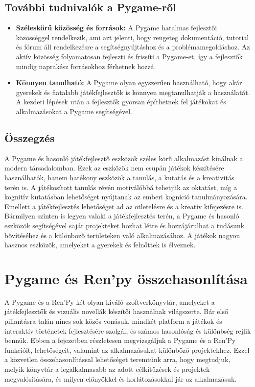 \subsection{További tudnivalók a Pygame-ről}

\begin{itemize}
\item \textbf{Széleskörű közösség és források:}
A Pygame hatalmas fejlesztői közösséggel rendelkezik, ami azt jelenti, hogy rengeteg dokumentáció, tutorial és fórum áll rendelkezésre a segítségnyújtáshoz és a problémamegoldáshoz. Az aktív közösség folyamatosan fejleszti és frissíti a Pygame-et, így a fejlesztők mindig naprakész forrásokhoz férhetnek hozzá.

\item \textbf{Könnyen tanulható:}
A Pygame olyan egyszerűen használható, hogy akár gyerekek és fiatalabb játékfejlesztők is könnyen megtanulhatják a használatát. A kezdeti lépések után a fejlesztők gyorsan építhetnek fel játékokat és alkalmazásokat a Pygame segítségével.
\end{itemize}

\subsection{Összegzés}
 A Pygame és hasonló játékfejlesztő eszközök széles körű alkalmazást kínálnak a modern társadalomban.
 Ezek az eszközök nem csupán játékok készítésére használhatók, hanem hatékony eszközök a tanulás,
  a kutatás és a kreativitás terén is. A játékosított tanulás révén motiválóbbá tehetjük az oktatást, 
  míg a kognitív kutatásban lehetőséget nyújtanak az emberi kogníció tanulmányozására.
   Emellett a játékfejlesztés lehetőséget ad az ötletelésre és a kreatív kifejezésre is.
    Bármilyen szinten is legyen valaki a játékfejlesztés terén,
 a Pygame és hasonló eszközök segítségével saját projekteket hozhat létre és hozzájárulhat a
  tudásunk bővítéséhez és a különböző területeken való alkalmazásához.
   A játékok nagyon hasznos eszközök, amelyeket a gyerekek és felnőttek is élveznek.



\section{Pygame és Ren'py összehasonlítása} 
 A Pygame és a Ren'Py \cite{renpy} két olyan kiváló szoftverkönyvtár, amelyeket a játékfejlesztők és vizuális novellák készítői használnak világszerte. Bár első pillantásra talán nincs sok közös vonásuk, mindkét platform a játékok és interaktív történetek fejlesztésére szolgál, és számos hasonlóság és különbség rejlik bennük. Ebben a fejezetben részletesen megvizsgáljuk a Pygame és a Ren'Py funkcióit, lehetőségeit, valamint az alkalmazásukat különböző projektekhez. Ezzel a közvetlen összehasonlítással \cite{Pygame-renpy} lehetőséget teremtünk arra, hogy megtudjuk, melyik könyvtár a legalkalmasabb az adott célkitűzések és projektek megvalósítására, és milyen előnyökkel és korlátozásokkal jár az alkalmazásuk.

